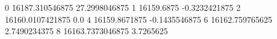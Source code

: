 0 16187.310546875 27.2998046875
1 16159.6875 -0.3232421875
2 16160.0107421875 0.0
4 16159.8671875 -0.1435546875
6 16162.759765625 2.7490234375
8 16163.7373046875 3.7265625
